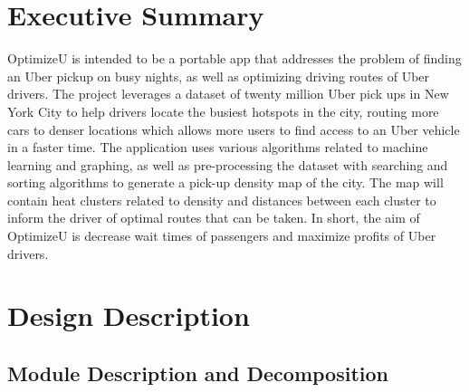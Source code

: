 \documentclass[12pt]{article}
\begin{document}
\newpage

\section{Executive Summary}
OptimizeU is intended to be a portable app that addresses the problem of finding an Uber pickup
on busy nights, as well as optimizing driving routes of Uber drivers. The project leverages a 
dataset of twenty million Uber pick ups in New York City to help drivers locate the
busiest hotspots in the city, routing more cars to denser locations which allows more users
to find access to an Uber vehicle in a faster time. The application uses various algorithms
related to machine learning and graphing, as well as pre-processing the dataset with searching
and sorting algorithms to generate a pick-up density map of the city. The map will contain
heat clusters related to density and distances between each cluster to inform the driver of
optimal routes that can be taken. In short, the aim of OptimizeU is decrease wait times of
passengers and maximize profits of Uber drivers.

\newpage

\section{Design Description}
\subsection{Module Description and Decomposition}
\end{document}
